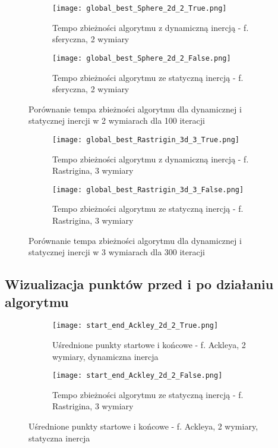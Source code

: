 \documentclass[12pt]{article}
\begin{document}
\begin{figure}[h!]
	\centering
	\begin{subfigure}{0.49\textwidth}
		\texttt{[image: global\_best\_Sphere\_2d\_2\_True.png]}
		\caption{Tempo zbieżności algorytmu z dynamiczną inercją - f. sferyczna, 2 wymiary}
	\end{subfigure}
	\hfill
	\begin{subfigure}{0.49\textwidth}
		\texttt{[image: global\_best\_Sphere\_2d\_2\_False.png]}
		\caption{Tempo zbieżności algorytmu ze statyczną inercją - f. sferyczna, 2 wymiary}
	\end{subfigure}
	\caption{Porównanie tempa zbieżności algorytmu dla dynamicznej i statycznej inercji w 2 wymiarach dla 100 iteracji}
	\label{2d_comp}
\end{figure}


\begin{figure}[h!]
	\centering
	\begin{subfigure}{0.49\textwidth}
		\texttt{[image: global\_best\_Rastrigin\_3d\_3\_True.png]}
		\caption{Tempo zbieżności algorytmu z dynamiczną inercją - f. Rastrigina, 3 wymiary}
	\end{subfigure}
	\hfill
	\begin{subfigure}{0.49\textwidth}
		\texttt{[image: global\_best\_Rastrigin\_3d\_3\_False.png]}
		\caption{Tempo zbieżności algorytmu ze statyczną inercją - f. Rastrigina, 3 wymiary}
	\end{subfigure}
	\caption{Porównanie tempa zbieżności algorytmu dla dynamicznej i statycznej inercji w 3 wymiarach dla 300 iteracji}
	\label{3d_comp}
\end{figure}

\pagebreak
\FloatBarrier


\subsection*{Wizualizacja punktów przed i po działaniu algorytmu}

\begin{figure}[h!]
	\centering
	\begin{subfigure}{0.49\textwidth}
		\texttt{[image: start\_end\_Ackley\_2d\_2\_True.png]}
		\caption{Uśrednione punkty startowe i końcowe - f. Ackleya, 2 wymiary, dynamiczna inercja}
	\end{subfigure}
	\hfill
	\begin{subfigure}{0.49\textwidth}
		\texttt{[image: start\_end\_Ackley\_2d\_2\_False.png]}
		\caption{Tempo zbieżności algorytmu ze statyczną inercją - f. Rastrigina, 3 wymiary}
	\end{subfigure}
	\caption{Uśrednione punkty startowe i końcowe - f. Ackleya, 2 wymiary, statyczna inercja}
	\label{ackley_start_end}
\end{figure}
\end{document}
